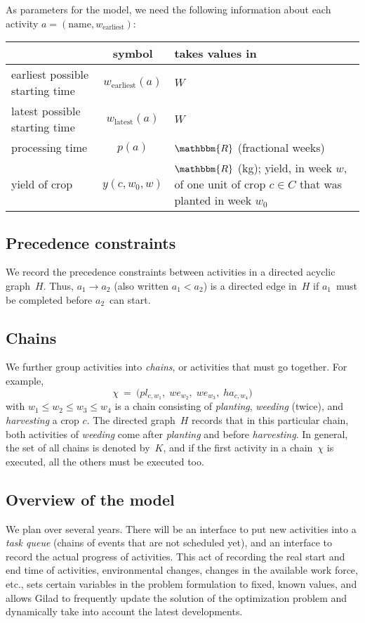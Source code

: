 \documentclass[11pt,reqno]{amsart}
\newcommand{\RR}{\mathbbm{R}}
\newcommand{\lra}{\longrightarrow}
\numberwithin{equation}{section}
\begin{document}
As parameters for the model, we need the following information about each activity $a=(\text{name}, w_{\text{earliest}})$:
\begin{center}
  \begin{tabular}{lcp{8cm}}
    & symbol & takes values in\\\hline 
    earliest possible starting time & $w_{\text{earliest}}(a)$ & $W$ \\ 
    latest possible starting time & $w_{\text{latest}}(a)$ & $W$ \\ 
    processing time & $p(a)$ & $\RR$ (fractional weeks)\\ 
    yield of crop & $y(c,w_0,w)$ & $\RR$ (kg); yield, in week $w$, of one unit of crop $c\in C$ that was planted in week $w_0$\\\hline
  \end{tabular}
\end{center}

\subsection{Precedence constraints}

We record the precedence constraints between  activities in a directed acyclic
graph~$H$. Thus, $a_1\lra a_2$ (also written $a_1<a_2$) is a directed edge
in~$H$ if $a_1$~must be completed before $a_2$~can start. 

\subsection{Chains}
We further group activities into \emph{chains}, or activities that must go
together. For example,
\[
   \chi
   \ = \
   \big(pl_{c,w_1}, \;
    we_{w_2},\;
    we_{w_3},\;
    ha_{c,w_4}\big)
\]
with $w_1\le w_2\le w_3\le w_4$ is a chain consisting of \emph{planting}, \emph{weeding}
(twice), and \emph{harvesting} a crop $c$. The directed graph~$H$ records that in this
particular chain, both activities of \emph{weeding} come after \emph{planting} and before
\emph{harvesting}. In general, the set of all chains is denoted by~$K$, and if the first
activity in a chain~$\chi$ is executed, all the others must be executed too.



\subsection{Overview of the model}

We plan over several years. There will be an interface to put new activities into a
\emph{task queue} (chains of events that are not scheduled yet), and an interface to
record the actual progress of activities. This act of recording the real start and end
time of activities, environmental changes, changes in the available work force, etc., sets
certain variables in the problem formulation to fixed, known values, and allows Gilad to
frequently update the solution of the optimization problem and dynamically take into
account the latest developments.
\end{document}
